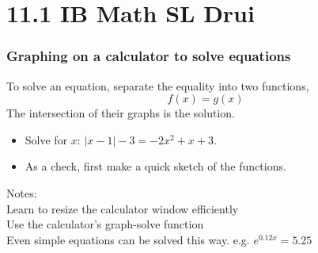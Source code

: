 \documentclass{beamer}
\begin{document}
\section{11.1 IB Math SL Drui}
\frame
{
  \frametitle{Graphing on a calculator to solve equations}

\begin{block}{To solve an equation, separate the equality into two functions, \[f(x)=g(x)\]The intersection of their graphs is the solution.}
  \begin{itemize}
      \item Solve for $x$: $|x-1|-3 = -2x^2+x+3$.
      \item As a check, first make a quick sketch of the functions.
  \end{itemize}
  \end{block}
  Notes: \\Learn to resize the calculator window efficiently\\
  Use the calculator's graph-solve function\\
  Even simple equations can be solved this way. e.g. $e^{0.12x} = 5.25$
}
\end{document}
